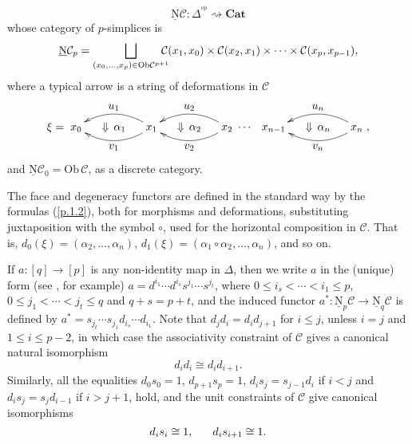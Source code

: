 \documentclass[]{amsart}
\begin{document}
\begin{equation}\label{ps1.1}{\ensuremath{\underline{\mathrm{N}}}}{\ensuremath{\mathcal{C}}}: \Delta^{\!^{\mathrm{op}}}\rightsquigarrow {\ensuremath{\mathbf{Cat}}}
\end{equation} whose category of $p$-simplices is
$$
{\ensuremath{\underline{\mathrm{N}}}}{\ensuremath{\mathcal{C}}}_p = \bigsqcup_{(x_0,\ldots,x_p)\in \mbox{\scriptsize Ob}{\ensuremath{\mathcal{C}}}^{p+1}}\hspace{-0.3cm}
{\ensuremath{\mathcal{C}}}(x_1,x_0)\times{\ensuremath{\mathcal{C}}}(x_2,x_1)\times\cdots\times{\ensuremath{\mathcal{C}}}(x_p,x_{p-1}),
$$
where a typical arrow is a string of deformations in ${\ensuremath{\mathcal{C}}}$
\begin{equation}\label{xi}
\xi=\xymatrix @C=1pc {x_0  & {\Downarrow\, \alpha_1} & x_1 \ar@/^1pc/[ll]^{\textstyle v_1}
\ar@/_1pc/[ll]_-{\textstyle u_1} & {\Downarrow\, \alpha_2} & x_2  \ar@/^1pc/[ll]^{\textstyle v_2}
\ar@/_1pc/[ll]_-{\textstyle u_2}&\hspace{-15pt}\cdots&\hspace{-10pt}
 x_{n-1}
  & {\Downarrow\, \alpha_n} & x_n
\ar@/^1pc/[ll]^{\textstyle v_n} \ar@/_1pc/[ll]_-{\textstyle u_n}},
\end{equation}
and ${\ensuremath{\underline{\mathrm{N}}}}{\ensuremath{\mathcal{C}}}_0=\mbox{Ob}\,{\ensuremath{\mathcal{C}}}$, as a discrete category.

The face and degeneracy functors are defined in the standard way by the formulas (\ref{p.1.2}),
both for morphisms and deformations, substituting  juxtaposition with the symbol $\circ$, used for
the horizontal composition in ${\ensuremath{\mathcal{C}}}$. That is, $d_0(\xi)= (\alpha_2,\dots,\alpha_n)$,
$d_1(\xi)=(\alpha_1\circ \alpha_2,\dots,\alpha_n)$, and so on.

If $a:[q]\to[p]$ is any non-identity map in $\Delta$, then we write $a$ in the (unique) form (see
\cite{may67}, for example) $a=d^{i_1}\cdots d^{i_s}s^{j_1}\cdots s^{j_t}$, where $0\leq i_s<\cdots<
i_1 \leq p$, $0\leq j_1<\cdots< j_t \leq q$ and $q+s=p+t$, and the induced functor
$a^*:{\ensuremath{\underline{\mathrm{N}}}}_p{\ensuremath{\mathcal{C}}}\to{\ensuremath{\underline{\mathrm{N}}}}_q{\ensuremath{\mathcal{C}}}$ is defined by $a^*=s_{j_t}\cdots s_{j_1}d_{i_s}\cdots d_{i_1}$. Note
that $d_jd_i=d_id_{j+1}$ for $i\leq j$, unless $i=j$ and $1\leq i\leq p-2$, in which case the
associativity constraint of ${\ensuremath{\mathcal{C}}}$ gives a  canonical natural isomorphism
\begin{equation}\label{ps1.2} d_id_i \cong d_id_{i+1}. \end{equation}
Similarly, all the equalities $d_0s_0=1$, $d_{p+1}s_p=1$, $d_is_j=s_{j-1}d_i$ if $i<j$ and
$d_is_j=s_jd_{i-1}$ if $i>j+1$, hold, and the unit constraints of ${\ensuremath{\mathcal{C}}}$ give canonical isomorphisms
\begin{equation}\label{ps1.3} d_is_i\cong 1, \hspace{0.6cm} d_is_{i+1}\cong 1. \end{equation}
\end{document}
